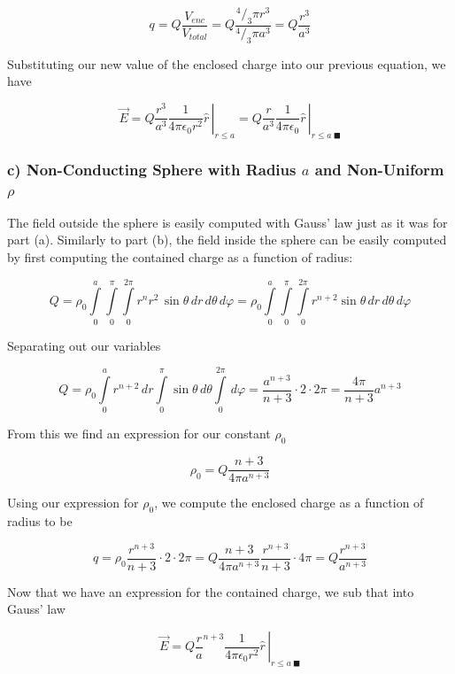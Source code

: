 \begin{equation}
  q
  = Q \frac{V_{enc}}{V_{total}}
  = Q \frac{^4/_3 \pi r^3}{^4/_3 \pi a^3}
  = Q \frac{r^3}{a^3}
\end{equation}

Substituting our new value of the enclosed charge into our previous
equation, we have

\begin{equation}
  \vec{E} = \left. Q \frac{r^3}{a^3}\frac{1}{4 \pi \epsilon_0 r^2} \hat{r}\, \right|_{r \leq a}
  = \left. Q \frac{r}{a^3}\frac{1}{4 \pi \epsilon_0} \hat{r}\, \right|_{r \leq a\ \blacksquare}
\end{equation}


\subsubsection*{c) Non-Conducting Sphere with Radius $a$ and Non-Uniform $\rho$}

The field outside the sphere is easily computed with Gauss' law just
as it was for part (a).  Similarly to part (b), the field inside the
sphere can be easily computed by first computing the contained charge
as a function of radius:

\begin{equation}
  Q
  = \rho_0
  \int\limits_0^a
  \int\limits_0^\pi
  \int\limits_0^{2\pi}
  r^n
  r^2\,\sin{\theta}
  \,dr
  \,d\theta
  \,d\varphi
  = \rho_0
  \int\limits_0^a
  \int\limits_0^\pi
  \int\limits_0^{2\pi}
  r^{n+2}
  \sin{\theta}
  \,dr
  \,d\theta
  \,d\varphi
\end{equation}

Separating out our variables

\begin{equation}
  Q
  = \rho_0
  \int\limits_0^a
  r^{n+2}
  \,dr
  \int\limits_0^\pi
  \sin{\theta}
  \,d\theta
  \int\limits_0^{2\pi}
  \,d\varphi
  = \frac{a^{n+3}}{n+3} \cdot 2 \cdot 2\pi
  = \frac{4\pi}{n+3} a^{n+3}
\end{equation}

From this we find an expression for our constant $\rho_0$

\begin{equation}
  \rho_0 = Q \frac{n+3}{4\pi a^{n+3}}
\end{equation}

Using our expression for $\rho_0$, we compute the enclosed charge as a
function of radius to be

\begin{equation}
  q
  = \rho_0 \frac{r^{n+3}}{n+3} \cdot 2 \cdot 2\pi
  = Q \frac{n+3}{4\pi a^{n+3}} \frac{r^{n+3}}{n+3} \cdot 4\pi
  = Q \frac{r^{n+3}}{a^{n+3}}
\end{equation}

Now that we have an expression for the contained charge, we sub that
into Gauss' law

\begin{equation}
  \vec{E}
  = \left. Q \frac{r}{a}^{n+3} \frac{1}{4 \pi \epsilon_0 r^2} \hat{r}\, \right|_{r \leq a\ \blacksquare}
\end{equation}
